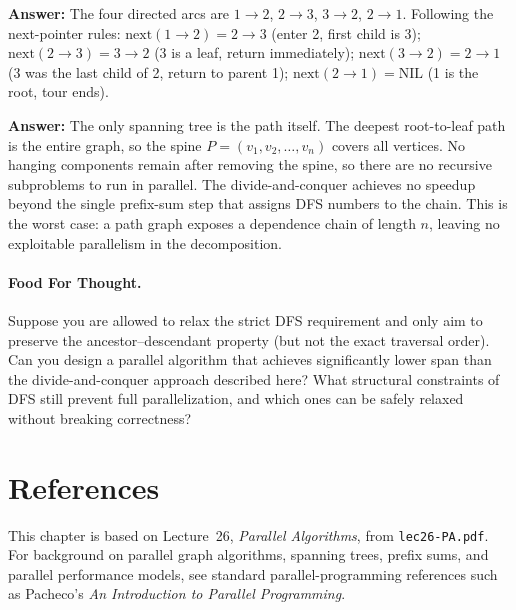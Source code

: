 \begin{ppexercises}

  \textbf{Answer:} The four directed arcs are \(1{\to}2\), \(2{\to}3\), \(3{\to}2\), \(2{\to}1\).
  Following the next-pointer rules:
  \(\mathrm{next}(1{\to}2) = 2{\to}3\) (enter 2, first child is 3);
  \(\mathrm{next}(2{\to}3) = 3{\to}2\) (3 is a leaf, return immediately);
  \(\mathrm{next}(3{\to}2) = 2{\to}1\) (3 was the last child of 2, return to parent 1);
  \(\mathrm{next}(2{\to}1) = \mathrm{NIL}\) (1 is the root, tour ends).


  \textbf{Answer:} The only spanning tree is the path itself.
  The deepest root-to-leaf path is the entire graph, so the spine \(P = (v_1, v_2, \ldots, v_n)\) covers all vertices.
  No hanging components remain after removing the spine, so there are no recursive subproblems to run in parallel.
  The divide-and-conquer achieves no speedup beyond the single prefix-sum step that assigns DFS numbers to the chain.
  This is the worst case: a path graph exposes a dependence chain of length \(n\), leaving no exploitable parallelism in the decomposition.
\end{ppexercises}

\paragraph{Food For Thought.}
Suppose you are allowed to relax the strict DFS requirement and only aim to preserve the ancestor--descendant property (but not the exact traversal order). 
Can you design a parallel algorithm that achieves significantly lower span than the divide-and-conquer approach described here? 
What structural constraints of DFS still prevent full parallelization, and which ones can be safely relaxed without breaking correctness?

\section*{References}

This chapter is based on Lecture~26, \emph{Parallel Algorithms}, from \texttt{lec26-PA.pdf}.
For background on parallel graph algorithms, spanning trees, prefix sums, and parallel performance models, see standard parallel-programming references such as Pacheco's \emph{An Introduction to Parallel Programming}.

